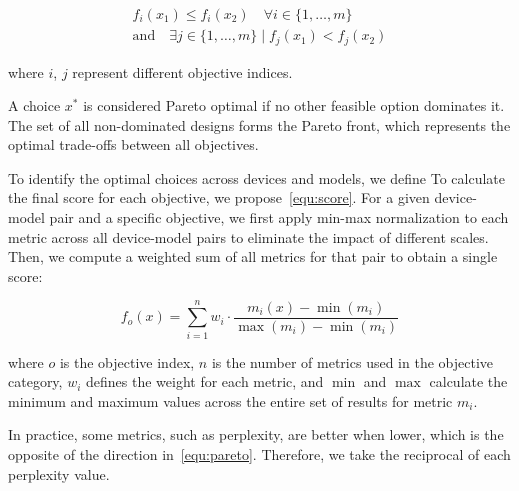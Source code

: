 \begin{multline} \label{equ:pareto}
f_i(x_1) \leq f_i(x_2) \quad \forall i \in \{1, \dots, m\} \\
\text{and} \quad \exists j \in \{1, \dots, m\} \mid f_j(x_1) < f_j(x_2)
\end{multline}

where $i$, $j$ represent different objective indices.

A choice $x^*$ is considered Pareto optimal if no other feasible option dominates it. The set of all non-dominated designs forms the Pareto front, which represents the optimal trade-offs between all objectives.

To identify the optimal choices across devices and models, we define  To calculate the final score for each objective, we propose~\cref{equ:score}. For a given device-model pair and a specific objective, we first apply min-max normalization to each metric across all device-model pairs to eliminate the impact of different scales. Then, we compute a weighted sum of all metrics for that pair to obtain a single score:

\begin{equation} \label{equ:score}
    f_{o}(x) = \sum_{i=1}^{n} w_i \cdot \frac{m_i(x) - \min(m_i)}{\max(m_i) - \min(m_i)}
\end{equation}

where $o$ is the objective index, $n$ is the number of metrics used in the objective category, $w_i$ defines the weight for each metric, and $\min$ and $\max$ calculate the minimum and maximum values across the entire set of results for metric $m_i$.

In practice, some metrics, such as perplexity, are better when lower, which is the opposite of the direction in~\cref{equ:pareto}. Therefore, we take the reciprocal of each perplexity value. 
%     
%     
%     
%     
    
